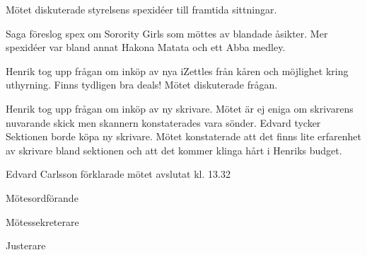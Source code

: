\documentclass[10pt]{article}
\def\mo{Edvard Carlsson}
\def\ms{Mattias Lundström}
\def\ji{Jonathan Benitez}
\begin{document}
\begin{paragrafer}
Mötet diskuterade styrelsens spexidéer till framtida sittningar. 

Saga föreslog spex om Sorority Girls som möttes av blandade åsikter. Mer spexidéer var bland annat Hakona Matata och ett Abba medley.  

Henrik tog upp frågan om inköp av nya iZettles från kåren och möjlighet kring uthyrning. Finns tydligen bra deals! Mötet diskuterade frågan. 

Henrik tog upp frågan om inköp av ny skrivare. Mötet är ej eniga om skrivarens nuvarande skick men skannern konstaterades vara sönder. Edvard tycker Sektionen borde köpa ny skrivare. Mötet konstaterade att det finns lite erfarenhet av skrivare bland sektionen och att det kommer klinga hårt i Henriks budget.


{\mo} förklarade mötet avslutat kl. 13.32 
\end{paragrafer}

\hidesignfoot
\begin{signatures}{3}
\signature{\mo}{Mötesordförande}
\signature{\ms}{Mötessekreterare}
\signature{\ji}{Justerare}
\end{signatures}
\end{document}
